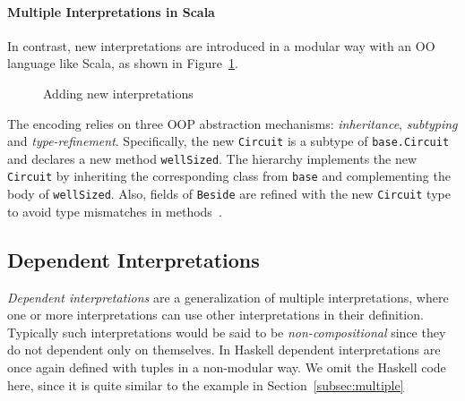 \paragraph{Multiple Interpretations in Scala}
In contrast, new interpretations are introduced in a 
modular way with an OO language like Scala, as shown in Figure~\ref{code:operation}.
\begin{figure}
\caption{Adding new interpretations}
\label{code:operation}
\end{figure}
The encoding relies on three OOP abstraction mechanisms:
\emph{inheritance}, \emph{subtyping} and \emph{type-refinement}.
Specifically, the new \lstinline{Circuit} is a subtype of
\lstinline{base.Circuit} and declares a new method \lstinline{wellSized}.
The hierarchy implements the new \lstinline{Circuit} by inheriting the corresponding class
from \lstinline{base} and
complementing the body of \lstinline{wellSized}.
Also, fields of \lstinline{Beside} are refined with the new \lstinline{Circuit} type
to avoid type mismatches in methods~\cite{eptrivially16}.

\begin{comment}
We can even define \lstinline{wellSized} independently:
\begin{lstlisting}
trait Circuit { def wellSized: Boolean }
trait Id extends Circuit { ... }
...
\end{lstlisting}
And merge the two hierarchies through \emph{multiple inheritance} for providing
multiple interpretations:
\begin{lstlisting}
trait Circuit
    extends width.Circuit with wellSized.Circuit
trait Id extends Circuit
    with width.Id with wellSized.Circuit
...
\end{lstlisting}
\end{comment}

\subsection{Dependent Interpretations}
 \emph{Dependent interpretations} are a generalization of multiple
interpretations, where one or more interpretations can use other
interpretations in their definition. Typically such interpretations 
would be said to be \emph{non-compositional} since they do not 
dependent only on themselves. 
In Haskell dependent interpretations are once again defined with
tuples in a non-modular way. We omit the Haskell code here, since 
it is quite similar to the example in Section~\ref{subsec:multiple}

